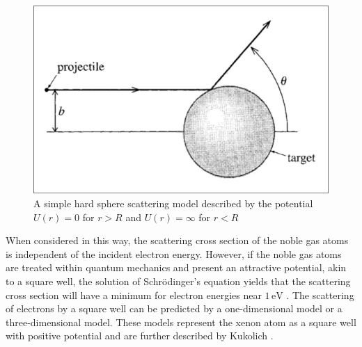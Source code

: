 \documentclass[%
reprint,
amsmath,amssymb,
aps,
floatfix
]{revtex4-2}
\begin{document}
	\begin{figure}
		\includegraphics[width=0.85\columnwidth]{hardSphereScattering.png}
		\caption{\label{fig:hardSphereScattering}A simple hard sphere scattering model described by the potential $U(r) = 0$ for $r > R$ and $U(r) = \infty$ for $r < R$}
	\end{figure}
	
	When considered in this way, the scattering cross section of the noble gas atoms is independent of the incident electron energy. However, if the noble gas atoms are treated within quantum mechanics and present an attractive potential, akin to a square well, the solution of Schrödinger's equation yields that the scattering cross section will have a minimum for electron energies near $1 \,\text{eV}$ \cite{kukolich}\cite{sobhani}. The scattering of electrons by a square well can be predicted by a one-dimensional model or a three-dimensional model. These models represent the xenon atom as a square well with positive potential and are further described by Kukolich \cite{kukolich}.\\
	
\end{document}
